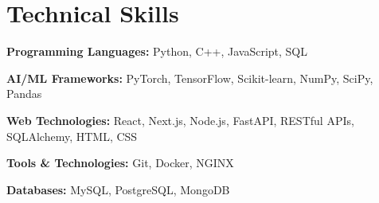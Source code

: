\section*{Technical Skills}

\textbf{Programming Languages:} Python, C++, JavaScript, SQL

\textbf{AI/ML Frameworks:} PyTorch, TensorFlow, Scikit-learn, NumPy, SciPy, Pandas

\textbf{Web Technologies:} React, Next.js, Node.js, FastAPI, RESTful APIs, SQLAlchemy, HTML, CSS

\textbf{Tools \& Technologies:} Git, Docker, NGINX

\textbf{Databases:} MySQL, PostgreSQL, MongoDB
